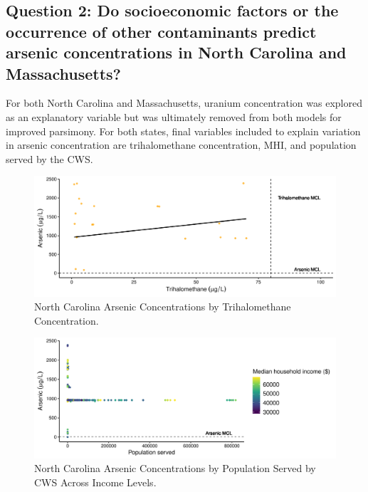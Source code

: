 \documentclass[12pt,]{article}
\begin{document}
\hypertarget{question-2-do-socioeconomic-factors-or-the-occurrence-of-other-contaminants-predict-arsenic-concentrations-in-north-carolina-and-massachusetts}{%
\subsection{Question 2: Do socioeconomic factors or the occurrence of
other contaminants predict arsenic concentrations in North Carolina and
Massachusetts?}\label{question-2-do-socioeconomic-factors-or-the-occurrence-of-other-contaminants-predict-arsenic-concentrations-in-north-carolina-and-massachusetts}}

For both North Carolina and Massachusetts, uranium concentration was
explored as an explanatory variable but was ultimately removed from both
models for improved parsimony. For both states, final variables included
to explain variation in arsenic concentration are trihalomethane
concentration, MHI, and population served by the CWS.

\begin{figure}
\centering
\includegraphics{Project_Template_files/figure-latex/figs9-1.pdf}
\caption{North Carolina Arsenic Concentrations by Trihalomethane
Concentration.}
\end{figure}

\begin{figure}
\centering
\includegraphics{Project_Template_files/figure-latex/figs10-1.pdf}
\caption{North Carolina Arsenic Concentrations by Population Served by
CWS Across Income Levels.}
\end{figure}
\end{document}
